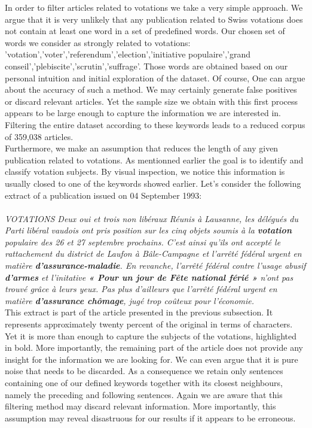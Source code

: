 \documentclass[11pt]{article}
\begin{document}
In order to filter articles related to votations we take a very simple approach. We argue that it is very unlikely that any publication related to Swiss votations does not contain at least one word in a set of predefined words. Our chosen set of words we consider as strongly related to votations: 'votation','voter','referendum','election','initiative populaire','grand conseil','plebiscite','scrutin','suffrage'. Those words are obtained based on our personal intuition and initial exploration of the dataset. Of course, One can argue about the accuracy of such a method. We may certainly generate false positives or discard relevant articles. Yet the sample size we obtain with this first process appears to be large enough to capture the information we are interested in. Filtering the entire dataset according to these keywords leads to a reduced corpus of 359,038 articles.
\\
Furthermore, we make an assumption that reduces the length of any given publication related to votations. As mentionned earlier the goal is to identify and classify votation subjects. By visual inspection, we notice this information is usually closed to one of the keywords showed earlier.
Let's consider the following extract of a publication issued on 04 September 1993:\\
\\
\textit{VOTATIONS Deux oui et trois non libéraux Réunis à Lausanne, les délégués du Parti libéral vaudois ont pris position sur les cinq objets soumis à la \textbf{votation} populaire des 26 et 27 septembre prochains. C'est ainsi qu'ils ont accepté le rattachement du district de Laufon à Bâle-Campagne et l'arrêté fédéral urgent en matière \textbf{d'assurance-maladie}. En revanche, l'arrêté fédéral contre l'usage abusif \textbf{d'armes} et l'initative \textbf{« Pour un jour de Fête national férié »} n'ont pas trouvé grâce à leurs yeux. Pas plus d'ailleurs que l'arrêté fédéral urgent en matière \textbf{d'assurance chômage}, jugé trop coûteux pour l'économie.}\\

This extract is part of the article presented in the previous subsection. It represents approximately twenty percent of the original in terms of characters. Yet it is more than enough to capture the subjects of the votations, highlighted in bold. More importantly, the remaining part of the article does not provide any insight for the information we are looking for. We can even argue that it is pure noise that needs to be discarded. As a consequence we retain only sentences containing one of our defined keywords together with its closest neighbours, namely the preceding and following sentences. Again we are aware that this filtering method may discard relevant information. More importantly, this assumption may reveal disastruous for our results if it appears to be erroneous.
\end{document}
